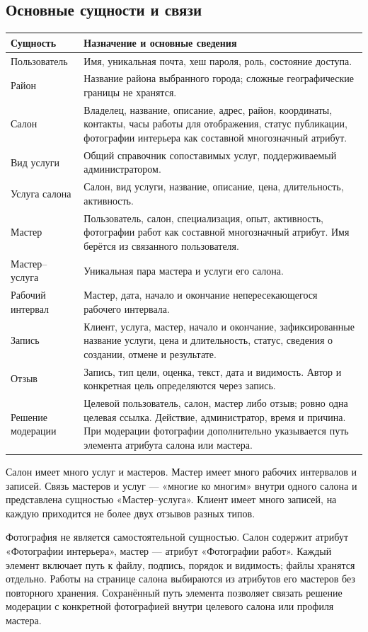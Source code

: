 \subsection{Основные сущности и связи}
\begin{longtable}{L{3.4cm}L{11.4cm}}
\toprule Сущность & Назначение и основные сведения \\ \midrule
\endhead
Пользователь & Имя, уникальная почта, хеш пароля, роль, состояние доступа. \\
Район & Название района выбранного города; сложные географические границы не хранятся. \\
Салон & Владелец, название, описание, адрес, район, координаты, контакты, часы работы для отображения, статус публикации, фотографии интерьера как составной многозначный атрибут. \\
Вид услуги & Общий справочник сопоставимых услуг, поддерживаемый администратором. \\
Услуга салона & Салон, вид услуги, название, описание, цена, длительность, активность. \\
Мастер & Пользователь, салон, специализация, опыт, активность, фотографии работ как составной многозначный атрибут. Имя берётся из связанного пользователя. \\
Мастер--услуга & Уникальная пара мастера и услуги его салона. \\
Рабочий интервал & Мастер, дата, начало и окончание непересекающегося рабочего интервала. \\
Запись & Клиент, услуга, мастер, начало и окончание, зафиксированные название услуги, цена и длительность, статус, сведения о создании, отмене и результате. \\
Отзыв & Запись, тип цели, оценка, текст, дата и видимость. Автор и конкретная цель определяются через запись. \\
Решение модерации & Целевой пользователь, салон, мастер либо отзыв; ровно одна целевая ссылка. Действие, администратор, время и причина. При модерации фотографии дополнительно указывается путь элемента атрибута салона или мастера. \\
\bottomrule
\end{longtable}
Салон имеет много услуг и мастеров. Мастер имеет много рабочих интервалов и записей. Связь мастеров и услуг --- «многие ко многим» внутри одного салона и представлена сущностью «Мастер--услуга». Клиент имеет много записей, на каждую приходится не более двух отзывов разных типов.

Фотография не является самостоятельной сущностью. Салон содержит атрибут «Фотографии интерьера», мастер --- атрибут «Фотографии работ». Каждый элемент включает путь к файлу, подпись, порядок и видимость; файлы хранятся отдельно. Работы на странице салона выбираются из атрибутов его мастеров без повторного хранения. Сохранённый путь элемента позволяет связать решение модерации с конкретной фотографией внутри целевого салона или профиля мастера.

